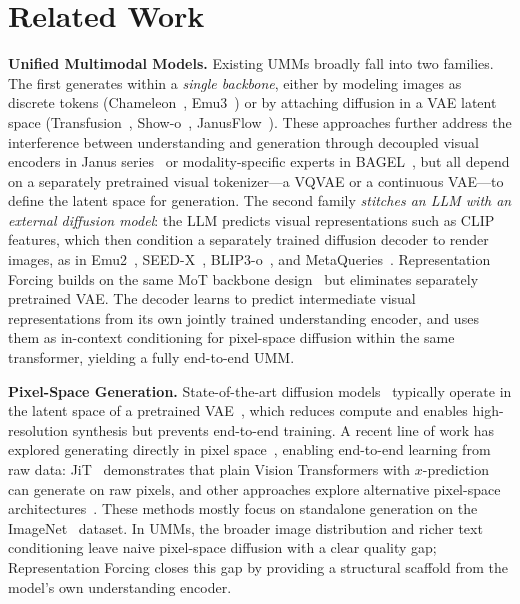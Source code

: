 \section{Related Work}
\label{sec:related}

\textbf{Unified Multimodal Models.}
Existing UMMs broadly fall into two families. The first generates within a \emph{single backbone}, either by modeling images as discrete tokens (Chameleon~\cite{chameleon}, Emu3~\cite{emu3}) or by attaching diffusion in a VAE latent space (Transfusion~\cite{transfusion}, Show-o~\cite{showo}, JanusFlow~\cite{janusflow}). These approaches further address the interference between understanding and generation through decoupled visual encoders in Janus series~\cite{janus,janus-pro,janusflow} or modality-specific experts in BAGEL~\cite{bagel}, but all depend on a separately pretrained visual tokenizer---a VQVAE or a continuous VAE---to define the latent space for generation. The second family \emph{stitches an LLM with an external diffusion model}: the LLM predicts visual representations such as CLIP features, which then condition a separately trained diffusion decoder to render images, as in Emu2~\cite{emu2}, SEED-X~\cite{seedx}, BLIP3-o~\cite{blip3o}, and MetaQueries~\cite{metaquery}.
Representation Forcing builds on the same MoT backbone design~\cite{bagel} but eliminates separately pretrained VAE. The decoder learns to predict intermediate visual representations from its own jointly trained understanding encoder, and uses them as in-context conditioning for pixel-space diffusion within the same transformer, yielding a fully end-to-end UMM.

\textbf{Pixel-Space Generation.}
State-of-the-art diffusion models~\cite{stable_diff,flux} typically operate in the latent space of a pretrained VAE~\cite{vae}, which reduces compute and enables high-resolution synthesis but prevents end-to-end training. A recent line of work has explored generating directly in pixel space~\cite{DDPM_paper,dhariwal2021diffusion}, enabling end-to-end learning from raw data: JiT~\cite{jit} demonstrates that plain Vision Transformers with $x$-prediction can generate on raw pixels, and other approaches explore alternative pixel-space architectures~\cite{sid2,pixelflow,pixnerd}. These methods mostly focus on standalone generation on the ImageNet~\cite{imagenet} dataset. In UMMs, the broader image distribution and richer text conditioning leave naive pixel-space diffusion with a clear quality gap; Representation Forcing closes this gap by providing a structural scaffold from the model's own understanding encoder.



